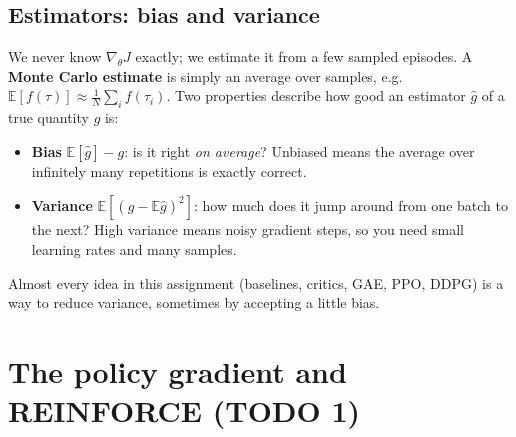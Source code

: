 \documentclass[11pt,a4paper]{article}
\newcommand{\E}{\mathbb{E}}
\newcommand{\gradt}{\nabla_\theta}
\begin{document}
\subsection{Estimators: bias and variance}
We never know $\gradt J$ exactly; we estimate it from a few sampled episodes. A \textbf{Monte Carlo estimate} is simply an average over samples, e.g.\ $\E[f(\tau)]\approx\frac1N\sum_i f(\tau_i)$. Two properties describe how good an estimator $\hat g$ of a true quantity $g$ is:
\begin{itemize}[nosep]
  \item \textbf{Bias} $\E[\hat g]-g$: is it right \emph{on average}? Unbiased means the average over infinitely many repetitions is exactly correct.
  \item \textbf{Variance} $\E[(\hat g-\E\hat g)^2]$: how much does it jump around from one batch to the next? High variance means noisy gradient steps, so you need small learning rates and many samples.
\end{itemize}
Almost every idea in this assignment (baselines, critics, GAE, PPO, DDPG) is a way to reduce variance, sometimes by accepting a little bias.


\section{The policy gradient and REINFORCE (TODO 1)}\label{sec:reinforce}
\end{document}
